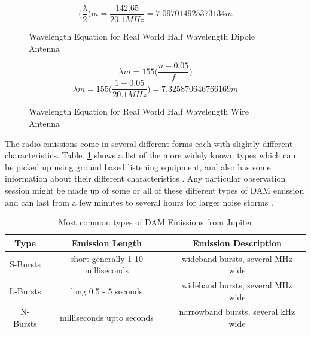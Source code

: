 %
\begin{figure}[here]
  \centering
  \begin{equation}  	
    \bigg(\frac{\lambda}{2}\bigg)m = \frac{142.65}{20.1 MHz} = 7.097014925373134 m
  \end{equation}
  \caption{Wavelength Equation for Real World Half Wavelength Dipole Antenna}
  \label{fig:wavelength_equation_dipole}
\end{figure}
%

%
\begin{figure}[here]
  \centering
  \begin{equation}  	
    \lambda m = 155 \bigg(\frac{n - 0.05}{f}\bigg)
  \end{equation}
  \begin{equation}  	
    \lambda m = 155 \bigg(\frac{1 - 0.05}{20.1 MHz}\bigg)  = 7.325870646766169 m
  \end{equation}
  \caption{Wavelength Equation for Real World Half Wavelength Wire Antenna}
  \label{fig:wavelength_equation_wire_antenna}
\end{figure}
%

The radio emissions come in several different forms each with slightly different characteristics. Table. \ref{tab:dam_emissions} shows a list of the more widely known types which can be picked up using ground based listening equipment, and also has some information about their different characteristics \citep{wilkinson94}. Any particular observation session might be made up of some or all of these different types of \gls{DAM} emission and can last from a few minutes to several hours for larger noise storms \citep{wilkinson94}.

%
\begin{table}
  \centering
  \begin{tabular}[pos]{| c | c | c |}
    \hline
    Type & Emission Length & Emission Description\\ \hline
    S-Bursts & short generally 1-10 milliseconds & wideband bursts, several MHz wide\\ \hline
    L-Bursts & long 0.5 - 5 seconds & wideband bursts, several MHz wide\\ \hline
    N-Bursts & milliseconds upto seconds & narrowband bursts, several kHz wide\\
    \hline
  \end{tabular}
  \caption{Most common types of DAM Emissions from Jupiter \citep{wilkinson94}}
  \label{tab:dam_emissions}
\end{table}
%


